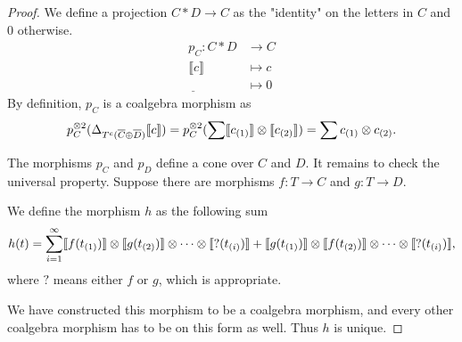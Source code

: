 \documentclass[../thesis.tex]{subfiles}
\begin{document}
                \begin{proof}
                    We define a projection $C\ast D \rightarrow C$ as the "identity" on the letters in $C$ and $0$ otherwise.
                    \begin{align*}
                        p_C : C\ast D & \rightarrow C \\
                        \llbracket c \rrbracket & \mapsto c \\
                        \underline{\phantom{A}} & \mapsto 0
                    \end{align*}
                    By definition, $p_C$ is a coalgebra morphism as 
                    \begin{align*}
                        p_C^{\otimes 2}(\Delta_{T^c(\overline{C}\oplus \overline{D})}\llbracket c \rrbracket) 
                        = p_C^{\otimes 2}(\sum \llbracket c_{(1)} \rrbracket \otimes \llbracket c_{(2)}\rrbracket)
                        = \sum c_{(1)} \otimes c_{(2)}\tt{.}
                    \end{align*}

                    The morphisms $p_C$ and $p_D$ define a cone over $C$ and $D$. It remains to check the universal property. Suppose there are morphisms $f: T \rightarrow C$ and $g: T \rightarrow D$.
                    \begin{center}
                    \end{center}

                    We define the morphism $h$ as the following sum
                    \begin{align*}
                        h(t) = \sum_{i=1}^\infty \llbracket f(t_{(1)}) \rrbracket \otimes \llbracket g(t_{(2)}) \rrbracket \otimes \cdots \otimes \llbracket ?(t_{(i)}) \rrbracket + \llbracket g(t_{(1)}) \rrbracket \otimes \llbracket f(t_{(2)}) \rrbracket \otimes \cdots \otimes \llbracket ?(t_{(i)}) \rrbracket\tt{,}
                    \end{align*}
                    where $?$ means either $f$ or $g$, which is appropriate.

                    We have constructed this morphism to be a coalgebra morphism, and every other coalgebra morphism has to be on this form as well. Thus $h$ is unique.
                \end{proof}
\end{document}
